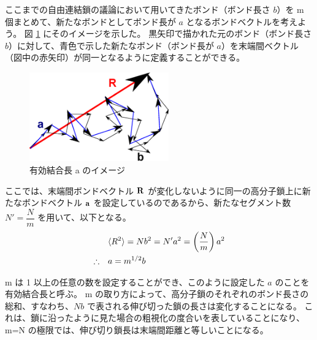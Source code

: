 \documentclass[uplatex,dvipdfmx,a4paper,11pt, titlepage]{jsarticle}
\begin{document}
ここまでの自由連結鎖の議論において用いてきたボンド（ボンド長さ $b$）を m 個まとめて、新たなボンドとしてボンド長が $a$ となるボンドベクトルを考えよう。
図 \ref{fig: EBL} にそのイメージを示した。
黒矢印で描かれた元のボンド（ボンド長さ $b$）に対して、青色で示した新たなボンド（ボンド長が $a$）を末端間ベクトル（図中の赤矢印）が同一となるように定義することができる。
\begin{figure}[htb]
 \centering
	\includegraphics[width=6cm]{figure/EBL.eps}
	\caption{有効結合長 a のイメージ}
	\label{fig: EBL}
\end{figure}

ここでは、末端間ボンドベクトル ${\bf R}$ が変化しないように同一の高分子鎖上に新たなボンドベクトル ${\bf a}$ を設定しているのであるから、新たなセグメント数 $N'=\dfrac{N}{m}$ を用いて、以下となる。
\begin{align}
&\langle R^2 \rangle = N b^2 = N' a^2 = \left(\dfrac{N}{m}\right) a^2 \notag \\
\therefore \quad &a = m^{1/2} b
\label{eq:EBL}
\end{align}

m は 1 以上の任意の数を設定することができ、このように設定した $a$ のことを有効結合長と呼ぶ。 
m の取り方によって、高分子鎖のそれぞれのボンド長さの総和、すなわち、$Nb$ で表される伸び切った鎖の長さは変化することになる。
これは、鎖に沿ったように見た場合の粗視化の度合いを表していることになり、m=N の極限では、伸び切り鎖長は末端間距離と等しいことになる。
\end{document}
